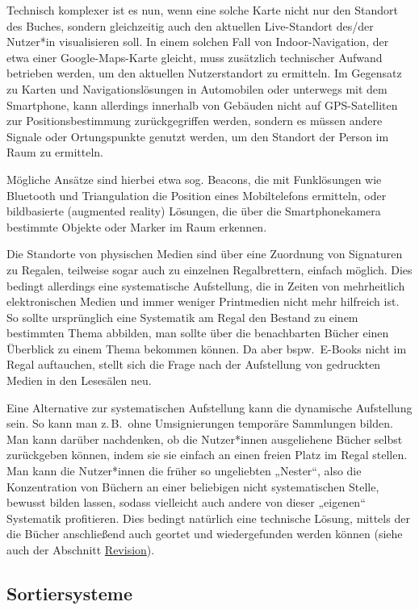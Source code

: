 \documentclass[
  11pt,
  letterpaper,
  DIV=11,
  twoside]{scrreprt}
\begin{document}
Technisch komplexer ist es nun, wenn eine solche Karte nicht nur den
Standort des Buches, sondern gleichzeitig auch den aktuellen
Live-Standort des/der Nutzer*in visualisieren soll. In einem solchen
Fall von Indoor-Navigation, der etwa einer Google-Maps-Karte gleicht,
muss zusätzlich technischer Aufwand betrieben werden, um den aktuellen
Nutzerstandort zu ermitteln. Im Gegensatz zu Karten und
Navigationslösungen in Automobilen oder unterwegs mit dem Smartphone,
kann allerdings innerhalb von Gebäuden nicht auf GPS-Satelliten zur
Positionsbestimmung zurückgegriffen werden, sondern es müssen andere
Signale oder Ortungspunkte genutzt werden, um den Standort der Person im
Raum zu ermitteln.

Mögliche Ansätze sind hierbei etwa sog. Beacons, die mit Funklösungen
wie Bluetooth und Triangulation die Position eines Mobiltelefons
ermitteln, oder bildbasierte (augmented reality) Lösungen, die über die
Smartphonekamera bestimmte Objekte oder Marker im Raum erkennen.

Die Standorte von physischen Medien sind über eine Zuordnung von
Signaturen zu Regalen, teilweise sogar auch zu einzelnen Regalbrettern,
einfach möglich. Dies bedingt allerdings eine systematische Aufstellung,
die in Zeiten von mehrheitlich elektronischen Medien und immer weniger
Printmedien nicht mehr hilfreich ist. So sollte ursprünglich eine
Systematik am Regal den Bestand zu einem bestimmten Thema abbilden, man
sollte über die benachbarten Bücher einen Überblick zu einem Thema
bekommen können. Da aber bspw.~E-Books nicht im Regal auftauchen, stellt
sich die Frage nach der Aufstellung von gedruckten Medien in den
Lesesälen neu.

Eine Alternative zur systematischen Aufstellung kann die dynamische
Aufstellung sein. So kann man z.\,B.~ohne Umsignierungen temporäre
Sammlungen bilden. Man kann darüber nachdenken, ob die Nutzer*innen
ausgeliehene Bücher selbst zurückgeben können, indem sie sie einfach an
einen freien Platz im Regal stellen. Man kann die Nutzer*innen die
früher so ungeliebten „Nester``, also die Konzentration von Büchern an
einer beliebigen nicht systematischen Stelle, bewusst bilden lassen,
sodass vielleicht auch andere von dieser „eigenen`` Systematik
profitieren. Dies bedingt natürlich eine technische Lösung, mittels der
die Bücher anschließend auch geortet und wiedergefunden werden können
(siehe auch der Abschnitt \hyperref[revision]{Revision}).

\subsection{Sortiersysteme}\label{sortiersysteme}
\end{document}
